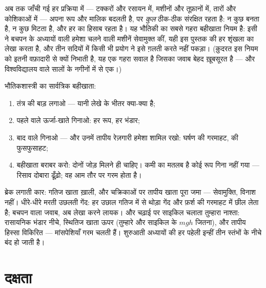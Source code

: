 \begin{proposition}[ऊर्जा संरक्षण]\label{prop:g9:energy-conversions:conservation}
अब तक जाँची गई हर प्रक्रिया में --- टक्करों और रसायन में, मशीनों और
तूफ़ानों में, तारों और कोशिकाओं में ---  अपना रूप और मालिक बदलती
है, पर \emph{कुल} ठीक-ठीक संरक्षित रहता है: न कुछ बनता है, न कुछ मिटता
है, और हर  का हिसाब रहता है। यह भौतिकी का सबसे गहरा बहीखाता नियम है:
इसी ने बचपन के अध्यायों वाली हमेशा चलने वाली मशीनें सेवामुक्त कीं, यही
इस पुस्तक की हर शृंखला का लेखा करता है, और तीन सदियों में किसी भी
प्रयोग ने इसे ग़लती करते नहीं पकड़ा। (क़ुदरत इस नियम को इतनी वफ़ादारी
से क्यों निभाती है, यह एक गहरा सवाल है जिसका जवाब बेहद ख़ूबसूरत है ---
और विश्वविद्यालय वाले सालों के नगीनों में से एक।)
\end{proposition}

\begin{method}[किसी भी प्रक्रिया का लेखा]\label{met:g9:energy-conversions:audit}
भौतिकशास्त्री का सार्वत्रिक बहीखाता:
\begin{enumerate}
  \item तंत्र की बाड़ लगाओ --- यानी लेखे के भीतर क्या-क्या है;
  \item पहले वाले ऊर्जा-खाते गिनाओ: हर रूप, हर भंडार;
  \item बाद वाले गिनाओ --- और उनमें तापीय रेज़गारी हमेशा शामिल रखो:
        घर्षण की गरमाहट,  की फुसफुसाहट;
  \item बहीखाता बराबर करो: दोनों जोड़ मिलने ही चाहिए। कमी का मतलब है
        कोई रूप गिना नहीं गया --- रिसाव दोबारा ढूँढ़ो; वह आम तौर पर
        गरम होता है।
\end{enumerate}
\end{method}

\begin{example}[लेखे, करके दिखाए हुए]\label{ex:g9:energy-conversions:audits}
ब्रेक लगाती कार: गतिज खाता ख़ाली, और चक्रिकाओं पर तापीय खाता पूरा जमा
--- सेवामुक्ति, विनाश नहीं। धीरे-धीरे मरती उछलती गेंद: हर उछाल
गतिज में से थोड़ा गेंद और फ़र्श की गरमाहट में छील लेता है; बचपन वाला
जवाब, अब लेखा करने लायक। और चढ़ाई पर साइकिल चलाता तुम्हारा नाश्ता:
रासायनिक भंडार नीचे, स्थितिज खाता ऊपर (तुम्हारे और साइकिल के $m g h$
जितना), और तापीय हिस्सा विकिरित --- मांसपेशियाँ गरम चलती हैं। शुरुआती
 अध्यायों की हर पहेली इन्हीं तीन स्तंभों के नीचे बंद हो जाती है।
\end{example}

\section{दक्षता}

